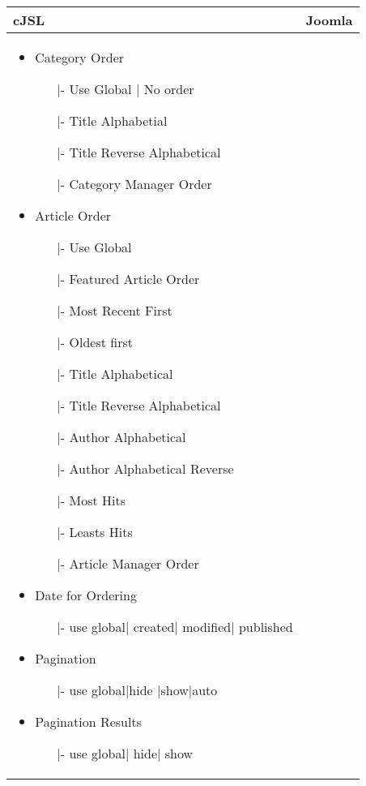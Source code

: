 \begin{minipage}{0.7\textwidth}
\begin{tabular}{|p{} | p{}|}
\hline
\textbf{cJSL} & \textbf{Joomla} \\ 
\hline
\begin{itemize}
\item Category Order
	\begin{enumerate}
		\item[|-] Use Global | No order
		\item[|-] Title Alphabetial
		\item[|-] Title Reverse Alphabetical
		\item[|-] Category Manager Order
	\end{enumerate}
\item  Article Order
	\begin{enumerate}
		\item[|-] Use Global
		\item[|-] Featured Article Order
		\item[|-] Most Recent First
		\item[|-] Oldest first
		\item[|-] Title Alphabetical
		\item[|-] Title Reverse Alphabetical
		\item[|-] Author Alphabetical
		\item[|-] Author Alphabetical Reverse
		\item[|-] Most Hits 
		\item[|-] Leasts Hits
		\item[|-] Article Manager Order 
	\end{enumerate}
\item Date for Ordering
	 \begin{enumerate}
	 \item[|-]use global| created| modified| published
	 \end{enumerate}
\item Pagination
	 \begin{enumerate}
	 	 \item[|-]use global|hide |show|auto
	 \end{enumerate}
\item Pagination Results
	\begin{enumerate}
	\item[|-]use global| hide| show
	\end{enumerate}
\end{itemize}
& 
\begin{itemize}

\end{itemize}
\end{tabular}
\end{minipage}
